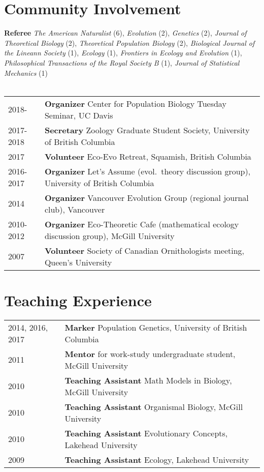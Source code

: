 \documentclass[12pt]{article}
\begin{document}
\section*{Community Involvement}

\noindent \textbf{Referee} \textit{The American Naturalist} (6), \textit{Evolution} (2), \textit{Genetics} (2), \textit{Journal of Theoretical Biology} (2), \textit{Theoretical Population Biology} (2), \textit{Biological Journal of the Lineann Society} (1), \textit{Ecology} (1), \textit{Frontiers in Ecology and Evolution} (1), \textit{Philosophical Transactions of the Royal Society B} (1), \textit{Journal of Statistical Mechanics} (1) \\\\
\begin{tabular}{ll}
2018- & \textbf{Organizer} Center for Population Biology Tuesday Seminar, UC Davis \\
2017-2018 & \textbf{Secretary} Zoology Graduate Student Society, University of British Columbia \\
2017 & \textbf{Volunteer} Eco-Evo Retreat, Squamish, British Columbia \\
2016-2017 & \textbf{Organizer} Let's Assume (evol.\ theory discussion group), University of British Columbia \\
2014 & \textbf{Organizer} Vancouver Evolution Group (regional journal club), Vancouver \\
2010-2012 & \textbf{Organizer} Eco-Theoretic Cafe (mathematical ecology discussion group), McGill University \\
2007 & \textbf{Volunteer} Society of Canadian Ornithologists meeting,  Queen's University
\end{tabular}

\section*{Teaching Experience}

\begin{tabular}{ll}
2014, 2016, 2017 & \textbf{Marker} Population Genetics, University of British Columbia \\
2011 & \textbf{Mentor} for work-study undergraduate student, McGill University \\
2010 & \textbf{Teaching Assistant} Math Models in Biology, McGill University \\
2010 & \textbf{Teaching Assistant} Organismal Biology, McGill University\\
2010 &  \textbf{Teaching Assistant} Evolutionary Concepts, Lakehead University\\
2009 &  \textbf{Teaching Assistant} Ecology, Lakehead University
\end{tabular}
\end{document}

